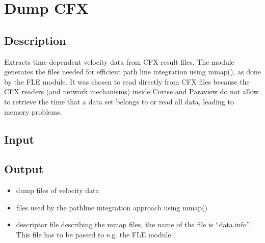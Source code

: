 \section{Dump CFX}
\label{sec:dump-cfx}


\subsection{Description}
Extracts time dependent velocity data from CFX result files. The module generates the files needed for efficient path line integration using mmap(), as done by the FLE module. It was chosen to read directly from CFX files because the CFX readers (and network mechanisms) inside Covise and Paraview do not allow to retrieve the time that a data set belongs to or read all data, leading to memory problems.


\subsection{Input}


\subsection{Output}
\begin{itemize}
\item
  dump files of velocity data
\item
  files used by the pathline integration approach using mmap()
\item
  descriptor file describing the mmap files, the name of the file is ``data.info''. This file has to be passed to e.g. the FLE module.
\end{itemize}


